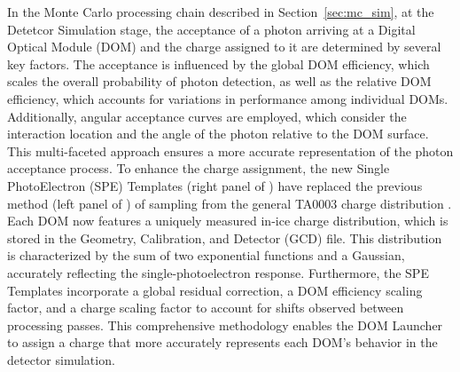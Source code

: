 In the Monte Carlo processing chain described in Section~\ref{sec:mc_sim}, at the Detetcor Simulation stage, the acceptance of a photon arriving at a Digital Optical Module (DOM) and the charge assigned to it are determined by several key factors. The acceptance is influenced by the global DOM efficiency, which scales the overall probability of photon detection, as well as the relative DOM efficiency, which accounts for variations in performance among individual DOMs. Additionally, angular acceptance curves are employed, which consider the interaction location and the angle of the photon relative to the DOM surface. This multi-faceted approach ensures a more accurate representation of the photon acceptance process.
To enhance the charge assignment, the new Single PhotoElectron (SPE) Templates (right panel of ) have replaced the previous method (left panel of ) of sampling from the general TA0003 charge distribution . Each DOM now features a uniquely measured in-ice charge distribution, which is stored in the Geometry, Calibration, and Detector (GCD) file. This distribution is characterized by the sum of two exponential functions and a Gaussian, accurately reflecting the single-photoelectron response. Furthermore, the SPE Templates incorporate a global residual correction, a DOM efficiency scaling factor, and a charge scaling factor to account for shifts observed between processing passes. This comprehensive methodology enables the DOM Launcher to assign a charge that more accurately represents each DOM's behavior in the detector simulation.

